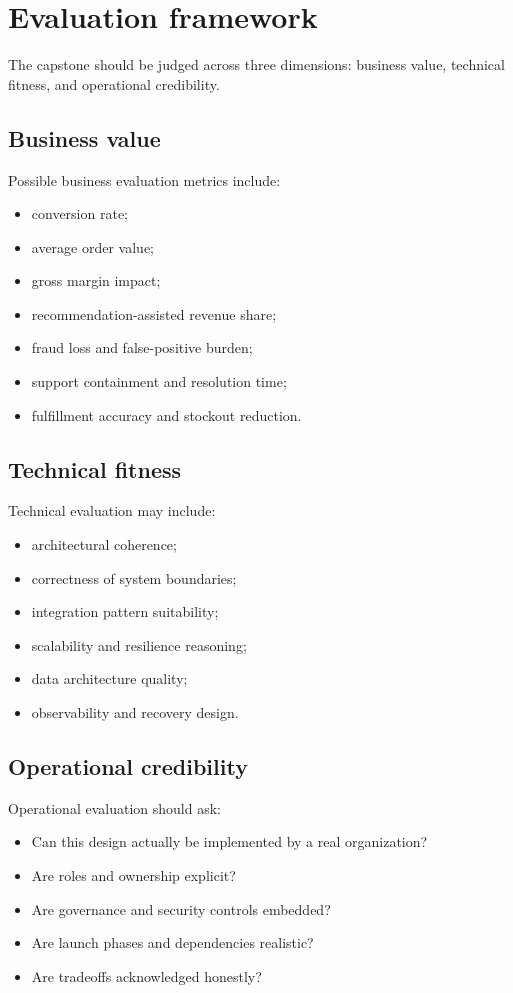\section{Evaluation framework}
The capstone should be judged across three dimensions: business value, technical fitness, and operational credibility.

\subsection{Business value}
Possible business evaluation metrics include:
\begin{itemize}
  \item conversion rate;
  \item average order value;
  \item gross margin impact;
  \item recommendation-assisted revenue share;
  \item fraud loss and false-positive burden;
  \item support containment and resolution time;
  \item fulfillment accuracy and stockout reduction.
\end{itemize}

\subsection{Technical fitness}
Technical evaluation may include:
\begin{itemize}
  \item architectural coherence;
  \item correctness of system boundaries;
  \item integration pattern suitability;
  \item scalability and resilience reasoning;
  \item data architecture quality;
  \item observability and recovery design.
\end{itemize}

\subsection{Operational credibility}
Operational evaluation should ask:
\begin{itemize}
  \item Can this design actually be implemented by a real organization?
  \item Are roles and ownership explicit?
  \item Are governance and security controls embedded?
  \item Are launch phases and dependencies realistic?
  \item Are tradeoffs acknowledged honestly?
\end{itemize}

